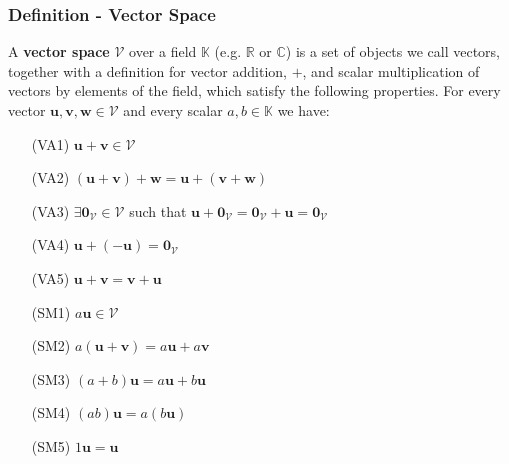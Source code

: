 \documentclass[usenames,dvipsnames,aspectratio=169,10pt]{beamer}
\numberwithin{equation}{section}
\begin{document}
\begin{frame}
\frametitle{Definition - Vector Space}
A \textbf{vector space} $\mathcal{V}$ over a field $\mathbb{K}$ (e.g. $\mathbb{R}$ or $\mathbb{C}$) is a set of objects we call vectors, together with a definition for vector addition, $+$, and scalar multiplication of vectors by elements of the field, which satisfy the following properties. For every vector $\textbf{u},\textbf{v},\textbf{w} \in \mathcal{V}$ and every scalar $a,b\in\mathbb{K}$ we have:

\hspace{0.5cm}\begin{minipage}{0.60\textwidth}
\begin{itemize}
\item[(VA1)] $\textbf{u}+\textbf{v} \in \mathcal{V}$
\item[(VA2)] $\left(\textbf{u}+\textbf{v}\right) +\textbf{w} = \textbf{u}+\left(\textbf{v} +\textbf{w}\right)$
\item[(VA3)] $\exists \textbf{0}_\mathcal{V}\in\mathcal{V}$ such that $\textbf{u}+\textbf{0}_\mathcal{V}=\textbf{0}_\mathcal{V}+\textbf{u}=\textbf{0}_\mathcal{V}$
\item[(VA4)] $\textbf{u}+(-\textbf{u})=\textbf{0}_\mathcal{V}$
\item[(VA5)] $\textbf{u}+\textbf{v} = \textbf{v}+\textbf{u}$
\end{itemize}
\end{minipage}
\begin{minipage}{0.3\textwidth}
\begin{itemize}
\item[(SM1)] $a\textbf{u} \in \mathcal{V}$
\item[(SM2)] $a\left(\textbf{u}+\textbf{v}\right) = a\textbf{u}+a\textbf{v}$
\item[(SM3)] $\left(a+b\right)\textbf{u} = a\textbf{u}+b\textbf{u}$
\item[(SM4)] $\left(ab\right)\textbf{u} = a\left(b\textbf{u}\right)$
\item[(SM5)] $1\textbf{u}=\textbf{u}$
\end{itemize}
\end{minipage}

\end{frame}
\end{document}
